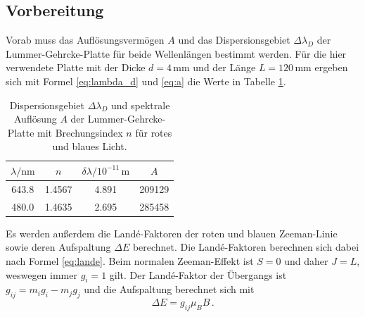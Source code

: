 \subsection{Vorbereitung}
Vorab muss das Auflösungsvermögen $A$ und das Dispersionsgebiet $\Delta \lambda_D$ der Lummer-Gehrcke-Platte 
für beide Wellenlängen bestimmt werden. Für die hier verwendete Platte mit der Dicke $d = 4 \, \si{\milli\meter}$ und 
der Länge $L = 120 \, \si{\milli\meter}$ ergeben sich mit Formel \eqref{eq:lambda_d} und \eqref{eq:a} die Werte in Tabelle \ref{tab:atab0}.
\FloatBarrier
\begin{table}[h]
    \centering
    \caption{Dispersionsgebiet $\Delta \lambda_D$ und spektrale Auflösung $A$ der Lummer-Gehrcke-Platte mit Brechungsindex $n$ für rotes und blaues Licht.}
    \label{tab:atab0}
    \begin{tabular}{c c c c}
        \toprule
        {$\lambda / \si{\nano\meter}$} & {$n$} & {$\delta \lambda / 10^{-11}\, \si{\meter}$} & {$A$}\\
        \midrule
        643.8 & 1.4567 & 4.891 & 209129 \\
        480.0 & 1.4635 & 2.695 & 285458 \\
        \bottomrule
    \end{tabular}
\end{table}
\FloatBarrier
\noindent
Es werden außerdem die Landé-Faktoren der roten und blauen Zeeman-Linie sowie deren Aufspaltung $\Delta E$ berechnet.
Die Landé-Faktoren berechnen sich dabei nach Formel \eqref{eq:lande}. Beim normalen Zeeman-Effekt ist $S = 0$ und daher
$J = L$, weswegen immer $g_i = 1$ gilt. Der Landé-Faktor der Übergangs ist $g_{ij} = m_i g_i - m_j g_j$ und die Aufspaltung
berechnet sich mit
\begin{equation*}
    \Delta E = g_{ij} \mu_B B \, .
\end{equation*}
\FloatBarrier
